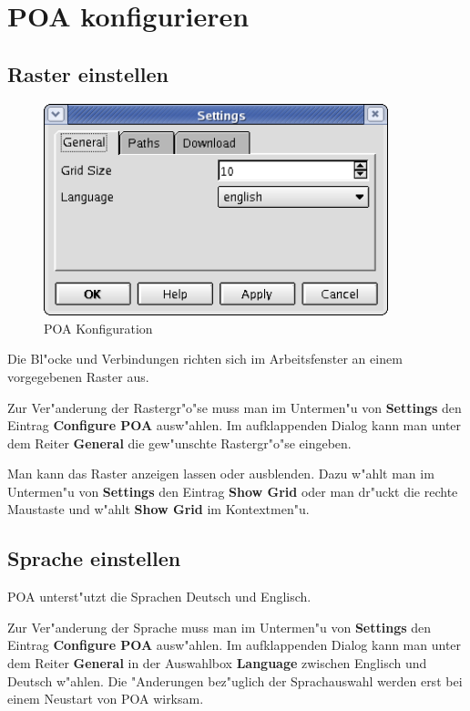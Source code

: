 \documentclass[a4paper,titlepage,12pt,ngerman]{scrbook}
\begin{document}
\newpage
\section{POA konfigurieren}

\subsection{Raster einstellen}
\begin{figure}[htbp]

\begin{center}

\includegraphics[width=10cm]{POAConfiguration1}

\caption{POA Konfiguration}\label{test}

\end{center}

\end{figure}
Die Bl"ocke und Verbindungen richten sich im Arbeitsfenster an einem vorgegebenen Raster aus.\par

Zur Ver"anderung der Rastergr"o"se muss man im Untermen"u von {\bf Settings} den Eintrag {\bf Configure POA} ausw"ahlen. Im aufklappenden Dialog kann man unter dem Reiter {\bf General} die gew"unschte Rastergr"o"se eingeben.\par
Man kann das Raster anzeigen lassen oder ausblenden. Dazu w"ahlt man im Untermen"u von {\bf Settings} den Eintrag {\bf Show Grid} oder man dr"uckt die rechte Maustaste und w"ahlt {\bf Show Grid} im Kontextmen"u.


\subsection{Sprache einstellen}
POA unterst"utzt die Sprachen Deutsch und Englisch.\par
Zur Ver"anderung der Sprache muss man im Untermen"u von {\bf Settings} den Eintrag {\bf Configure POA} ausw"ahlen. Im aufklappenden Dialog kann man unter dem Reiter {\bf General} in der Auswahlbox {\bf Language} zwischen Englisch und Deutsch w"ahlen. Die "Anderungen bez"uglich der Sprachauswahl werden erst bei einem Neustart von POA wirksam.\par
\end{document}
